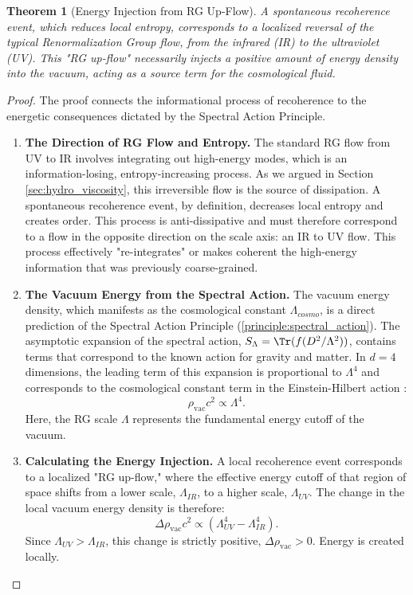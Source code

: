 \documentclass[11pt, letterpaper]{report}
\theoremstyle{plain} %
\newtheorem{theorem}{Theorem}[chapter]
\theoremstyle{definition} %
\theoremstyle{remark} %
\begin{document}
\begin{theorem}[Energy Injection from RG Up-Flow]
\label{thm:energy_from_rg_upflow}
A spontaneous recoherence event, which reduces local entropy, corresponds to a localized reversal of the typical Renormalization Group flow, from the infrared (IR) to the ultraviolet (UV). This "RG up-flow" necessarily injects a positive amount of energy density into the vacuum, acting as a source term for the cosmological fluid.
\end{theorem}
\begin{proof}
The proof connects the informational process of recoherence to the energetic consequences dictated by the Spectral Action Principle.
\begin{enumerate}
    \item \textbf{The Direction of RG Flow and Entropy.} The standard RG flow from UV to IR involves integrating out high-energy modes, which is an information-losing, entropy-increasing process. As we argued in Section \ref{sec:hydro_viscosity}, this irreversible flow is the source of dissipation. A spontaneous recoherence event, by definition, decreases local entropy and creates order. This process is anti-dissipative and must therefore correspond to a flow in the opposite direction on the scale axis: an IR to UV flow. This process effectively "re-integrates" or makes coherent the high-energy information that was previously coarse-grained.

    \item \textbf{The Vacuum Energy from the Spectral Action.} The vacuum energy density, which manifests as the cosmological constant $\Lambda_{cosmo}$, is a direct prediction of the Spectral Action Principle (\cref{principle:spectral_action}). The asymptotic expansion of the spectral action, $S_{\Lambda} = \Tr(f(D^2/\Lambda^2))$, contains terms that correspond to the known action for gravity and matter. In $d=4$ dimensions, the leading term of this expansion is proportional to $\Lambda^4$ and corresponds to the cosmological constant term in the Einstein-Hilbert action \cite{Chamseddine1997SpectralAction}:
    \begin{equation}
        \rho_{\text{vac}} c^2 \propto \Lambda^4.
    \end{equation}
    Here, the RG scale $\Lambda$ represents the fundamental energy cutoff of the vacuum.

    \item \textbf{Calculating the Energy Injection.} A local recoherence event corresponds to a localized "RG up-flow," where the effective energy cutoff of that region of space shifts from a lower scale, $\Lambda_{IR}$, to a higher scale, $\Lambda_{UV}$. The change in the local vacuum energy density is therefore:
    \begin{equation}
        \Delta \rho_{\text{vac}} c^2 \propto (\Lambda_{UV}^4 - \Lambda_{IR}^4).
    \end{equation}
    Since $\Lambda_{UV} > \Lambda_{IR}$, this change is strictly positive, $\Delta \rho_{\text{vac}} > 0$. Energy is created locally.


\end{enumerate}
\end{proof}
\end{document}
